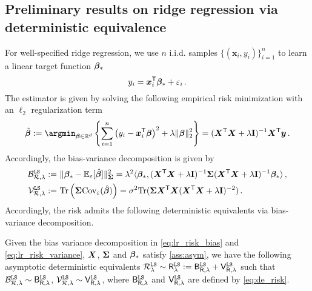 \subsection{Preliminary results on ridge regression via deterministic equivalence}
\label{app:pre_lr}

For well-specified ridge regression, we use $n$ i.i.d. samples $\{ (\bm x_i, y_i) \}_{i=1}^n$ to learn a linear target function ${\boldsymbol \beta}_*$
\[
    y_i = {\boldsymbol x}_i^{\mathsf T} {\boldsymbol \beta}_* + \varepsilon_i\,.
\]
The estimator is given by solving the following empirical risk minimization with an $\ell_2$ regularization term
\[
    \hat{\bm \beta} := \argmin_{\bbeta \in \mathbb{R}^d} \left\{ \sum_{i =1}^n \left(y_i - \bm x_i^\sT\bm \beta\right)^2 + \lambda \|\bbeta\|_2^2 \right\} = (\bX^\sT \bX + \lambda \id)^{-1} \bX^\sT \bm{y}\,.
\]
Accordingly, the bias-variance decomposition is given by
\begin{align}
    \mathcal{B}_{\mathcal{R},\lambda}^{\tt LS} :=&~ \|{\boldsymbol \beta}_* - \mathbb{E}_{\varepsilon}[\hat{{\boldsymbol \beta}}]\|_{{\boldsymbol \Sigma}}^2 = \lambda^2 \langle {\boldsymbol \beta}_*,({\boldsymbol X}^{\mathsf T} {\boldsymbol X} + \lambda{\mathbf I})^{-1} {\boldsymbol \Sigma} ({\boldsymbol X}^{\mathsf T} {\boldsymbol X} + \lambda{\mathbf I})^{-1} {\boldsymbol \beta}_* \rangle\,,\label{eq:lr_risk_bias}\\
    \mathcal{V}_{\mathcal{R},\lambda}^{\tt LS} :=&~ {\rm Tr}\left({\boldsymbol \Sigma} \mathrm{Cov}_{\varepsilon}(\hat{{\boldsymbol \beta}})\right) = \sigma^2{\rm Tr}({\boldsymbol \Sigma} {\boldsymbol X}^{\mathsf T} {\boldsymbol X} ({\boldsymbol X}^{\mathsf T} {\boldsymbol X} + \lambda{\mathbf I})^{-2})\,.\label{eq:lr_risk_variance}
\end{align}
Accordingly, the risk admits the following deterministic equivalents via bias-variance decomposition.
\begin{proposition}\citep[Restatement of Proposition 3]{bach2024high}\label{prop:asy_equiv_risk_LR}
    Given the bias variance decomposition in \cref{eq:lr_risk_bias} and \cref{eq:lr_risk_variance}, \({\boldsymbol X}\), \({\boldsymbol \Sigma}\) and \({\boldsymbol \beta}_*\) satisfy \cref{ass:asym}, we have the following asymptotic deterministic equivalents $\mathcal{R}_{\lambda}^{\tt LS}  \sim \mathsf R_{\lambda}^{\tt LS} := \mathsf B_{\mathsf R,\lambda}^{\tt LS} + \mathsf V_{\mathsf R,\lambda}^{\tt LS}$ such that $\mathcal{B}^{\tt LS}_{\mathcal{R},\lambda} \sim \mathsf B_{\mathsf R,\lambda}^{\tt LS}$, $\mathcal{V}^{\tt LS}_{\mathcal{R},\lambda} \sim \mathsf V_{\mathsf R,\lambda}^{\tt LS}$, where $\mathsf B_{\mathsf R,\lambda}^{\tt LS}$ and $\mathsf V_{\mathsf R,\lambda}^{\tt LS}$ are defined by \cref{eq:de_risk}.
\end{proposition}


